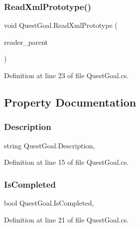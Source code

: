 \subsubsection{\texorpdfstring{Read\+Xml\+Prototype()}{ReadXmlPrototype()}}
{\footnotesize\ttfamily void Quest\+Goal.\+Read\+Xml\+Prototype (\begin{DoxyParamCaption}\item[{Xml\+Reader}]{reader\+\_\+parent }\end{DoxyParamCaption})}



Definition at line 23 of file Quest\+Goal.\+cs.



\subsection{Property Documentation}
\mbox{\label{class_quest_goal_ad4b0bca1c6790c0e1a59d25f79ac7b78}} 
\subsubsection{\texorpdfstring{Description}{Description}}
{\footnotesize\ttfamily string Quest\+Goal.\+Description\hspace{0.3cm}{\ttfamily [get]}, {\ttfamily [set]}}



Definition at line 15 of file Quest\+Goal.\+cs.

\mbox{\label{class_quest_goal_a7716d38f7f49316ccd0ce1a95487a819}} 
\subsubsection{\texorpdfstring{Is\+Completed}{IsCompleted}}
{\footnotesize\ttfamily bool Quest\+Goal.\+Is\+Completed\hspace{0.3cm}{\ttfamily [get]}, {\ttfamily [set]}}



Definition at line 21 of file Quest\+Goal.\+cs.

\mbox{\label{class_quest_goal_ac572c2786550e1ebe538d5e95d2f3dcf}} 
